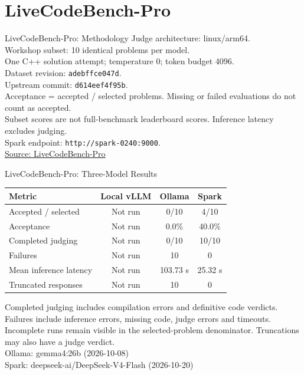 \section{LiveCodeBench-Pro}
\begin{frame}{LiveCodeBench-Pro: Methodology}
\small
Judge architecture: linux/arm64.\\
Workshop subset: 10 identical problems per model.\\
One C++ solution attempt; temperature 0; token budget 4096.\\
Dataset revision: \texttt{adebffce047d}.\\
Upstream commit: \texttt{d614eef4f95b}.\\
\vfill
Acceptance = accepted / selected problems. Missing or failed evaluations do not count as accepted.\\
Subset scores are not full-benchmark leaderboard scores. Inference latency excludes judging.\\
Spark endpoint: \texttt{http://spark-0240:9000}.\\
\href{https://github.com/GavinZhengOI/LiveCodeBench-Pro}{Source: LiveCodeBench-Pro}
\end{frame}
\begin{frame}{LiveCodeBench-Pro: Three-Model Results}
\small
\begin{tabular}{lccc}\toprule
Metric & Local vLLM & Ollama & Spark \\\midrule
Accepted / selected & Not run & 0/10 & 4/10 \\
Acceptance & Not run & 0.0\% & 40.0\% \\
Completed judging & Not run & 0/10 & 10/10 \\
Failures & Not run & 10 & 0 \\
Mean inference latency & Not run & 103.73 s & 25.32 s \\
Truncated responses & Not run & 10 & 0 \\
\bottomrule\end{tabular}
\vfill\footnotesize
Completed judging includes compilation errors and definitive code verdicts. Failures include inference errors, missing code, judge errors and timeouts.\\
Incomplete runs remain visible in the selected-problem denominator. Truncations may also have a judge verdict.\\
Ollama: gemma4:26b (2026-10-08)\\
Spark: deepseek-ai/DeepSeek-V4-Flash (2026-10-20)\\
\end{frame}
